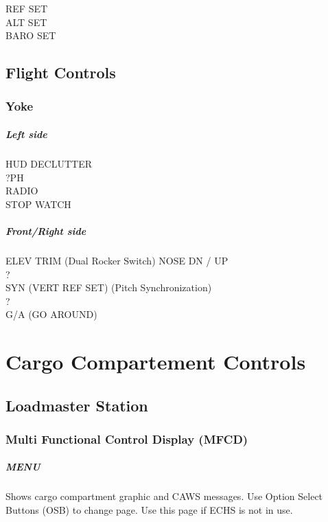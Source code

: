 REF SET\\
ALT SET\\
BARO SET

\section{Flight Controls}

\subsection{Yoke}

\paragraph*{Left side}
HUD DECLUTTER\\
?PH\\
RADIO\\
STOP WATCH

\paragraph*{Front/Right side}
ELEV TRIM (Dual Rocker Switch) NOSE DN / UP\\
?\\
SYN (VERT REF SET) (Pitch Synchronization)\\
?\\
G/A (GO AROUND)

\chapter{Cargo Compartement Controls}

\section{Loadmaster Station}

\subsection{Multi Functional Control Display (MFCD)}
\label{sec:mfcd}

\paragraph*{MENU}

Shows cargo compartment graphic and CAWS messages. Use Option Select Buttons (OSB) to change page. Use this page if \gls{ECHS} is not in use.

